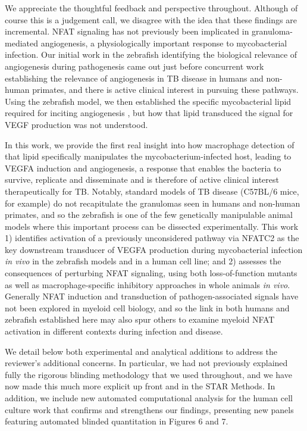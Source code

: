 \begin{description}[style=multiline, labelwidth=\widthof{Reviewer \#2:   }, font=\normalfont, leftmargin=\labelwidth, align=right]
\item[Response: ] \quad We appreciate the thoughtful feedback and perspective throughout. Although of course this is a judgement call, we disagree with the idea that these findings are incremental. NFAT signaling has not previously been implicated in granuloma\hyp{}mediated angiogenesis, a physiologically important response to mycobacterial infection. Our initial work in the zebrafish identifying the biological relevance of angiogenesis during pathogenesis \citep{Oehlers2015} came out just before concurrent work establishing the relevance of angiogenesis in TB disease in humans and non\hyp{}human primates, and there is active clinical interest in pursuing these pathways. Using the zebrafish model, we then established the specific mycobacterial lipid required for inciting angiogenesis \citep{Walton2018}, but how that lipid transduced the signal for VEGF production was not understood.

\item \quad In this work, we provide the first real insight into how macrophage detection of that lipid specifically manipulates the mycobacterium\hyp{}infected host, leading to VEGFA induction and angiogenesis, a response that enables the bacteria to survive, replicate and disseminate and is therefore of active clinical interest therapeutically for TB. Notably, standard models of TB disease (C57BL/6 mice, for example) do not recapitulate the granulomas seen in humans and non\hyp{}human primates, and so the zebrafish is one of the few genetically manipulable animal models where this important process can be dissected experimentally. This work 1) identifies activation of a previously unconsidered pathway via NFATC2 as the key downstream transducer of VEGFA production during mycobacterial infection \textit{in vivo} in the zebrafish models and in a human cell line; and 2) assesses the consequences of perturbing NFAT signaling, using both loss\hyp{}of\hyp{}function mutants as well as macrophage\hyp{}specific inhibitory approaches in whole animals \textit{in vivo}. Generally NFAT induction and transduction of pathogen\hyp{}associated signals have not been explored in myeloid cell biology, and so the link in both humans and zebrafish established here may also spur others to examine myeloid NFAT activation in different contexts during infection and disease.

\item \quad We detail below both experimental and analytical additions to address the reviewer’s additional concerns. In particular, we had not previously explained fully the rigorous blinding methodology that we used throughout, and we have now made this much more explicit up front and in the STAR Methods. In addition, we include new automated computational analysis for the human cell culture work that confirms and strengthens our findings, presenting new panels featuring automated blinded quantitation in Figures 6 and 7.


\end{description}
